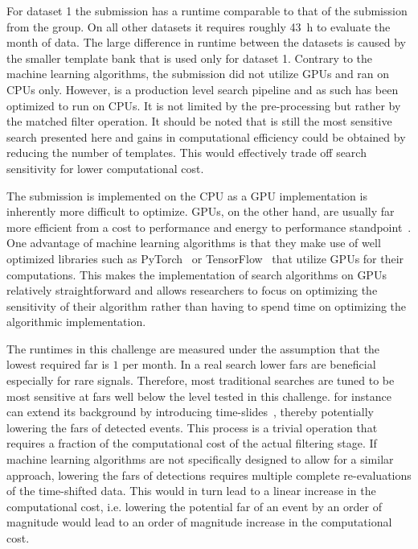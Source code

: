 For dataset 1 the \pycbc submission has a runtime comparable to that of the submission from the \virgo group. On all other datasets it requires roughly \SI{43}{\hour} to evaluate the month of data. The large difference in runtime between the datasets is caused by the smaller template bank that is used only for dataset 1. Contrary to the machine learning algorithms, the \pycbc submission did not utilize GPUs and ran on CPUs only. However, \pycbc is a production level search pipeline and as such has been optimized to run on CPUs. It is not limited by the pre-processing but rather by the matched filter operation. It should be noted that \pycbc is still the most sensitive search presented here and gains in computational efficiency could be obtained by reducing the number of templates. This would effectively trade off search sensitivity for lower computational cost.

The \pycbc submission is implemented on the CPU as a GPU implementation is inherently more difficult to optimize. GPUs, on the other hand, are usually far more efficient from a cost to performance and energy to performance standpoint~\cite{Dhurkunde:2021csz}. One advantage of machine learning algorithms is that they make use of well optimized libraries such as PyTorch~\cite{Paszke:2019aaa} or TensorFlow~\cite{Abadi:2015aaa} that utilize GPUs for their computations. This makes the implementation of search algorithms on GPUs relatively straightforward and allows researchers to focus on optimizing the sensitivity of their algorithm rather than having to spend time on optimizing the algorithmic implementation. 

The runtimes in this challenge are measured under the assumption that the lowest required \acrshort{far} is $1$ per month. In a real search lower \acrshort{far}s are beneficial especially for rare signals. Therefore, most traditional searches are tuned to be most sensitive at \acrshort{far}s well below the level tested in this challenge. \pycbc for instance can extend its background by introducing time-slides~\cite{Usman:2015kfa}, thereby potentially lowering the \acrshort{far}s of detected events. This process is a trivial operation that requires a fraction of the computational cost of the actual filtering stage. If machine learning algorithms are not specifically designed to allow for a similar approach, lowering the \acrshort{far}s of detections requires multiple complete re-evaluations of the time-shifted data. This would in turn lead to a linear increase in the computational cost, i.e. lowering the potential \acrshort{far} of an event by an order of magnitude would lead to an order of magnitude increase in the computational cost.


